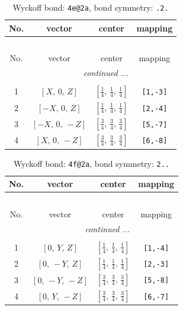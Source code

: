 \documentclass[fleqn,8pt]{jsarticle}
\begin{document}
\renewcommand{\arraystretch}{1.2}
\begin{longtable}{cccc}
\caption{Wyckoff bond: {\tt 4e@2a}, bond symmetry: {\tt .2.}}
 \\
 \hline \hline
No. & vector & center & mapping \\ \hline \endfirsthead

\multicolumn{3}{l}{\tablename\ \thetable{}} \\
 \hline \hline
No. & vector & center & mapping \\ \hline \endhead

 \hline \hline
\multicolumn{3}{r}{\footnotesize\it continued ...} \\ \endfoot

 \hline \hline
\multicolumn{3}{r}{} \\ \endlastfoot

1 & $\left[ X,\, 0,\, Z \right]$ & $\left[ \frac{1}{4},\, \frac{1}{4},\, \frac{1}{4} \right]$ & {\tt [1,-3]} \\ \hline
2 & $\left[ - X,\, 0,\, Z \right]$ & $\left[ \frac{1}{4},\, \frac{1}{4},\, \frac{1}{4} \right]$ & {\tt [2,-4]} \\ \hline
3 & $\left[ - X,\, 0,\, - Z \right]$ & $\left[ \frac{3}{4},\, \frac{3}{4},\, \frac{3}{4} \right]$ & {\tt [5,-7]} \\ \hline
4 & $\left[ X,\, 0,\, - Z \right]$ & $\left[ \frac{3}{4},\, \frac{3}{4},\, \frac{3}{4} \right]$ & {\tt [6,-8]} \\
\end{longtable}
\renewcommand{\arraystretch}{1.2}
\begin{longtable}{cccc}
\caption{Wyckoff bond: {\tt 4f@2a}, bond symmetry: {\tt 2..}}
 \\
 \hline \hline
No. & vector & center & mapping \\ \hline \endfirsthead

\multicolumn{3}{l}{\tablename\ \thetable{}} \\
 \hline \hline
No. & vector & center & mapping \\ \hline \endhead

 \hline \hline
\multicolumn{3}{r}{\footnotesize\it continued ...} \\ \endfoot

 \hline \hline
\multicolumn{3}{r}{} \\ \endlastfoot

1 & $\left[ 0,\, Y,\, Z \right]$ & $\left[ \frac{1}{4},\, \frac{1}{4},\, \frac{1}{4} \right]$ & {\tt [1,-4]} \\ \hline
2 & $\left[ 0,\, - Y,\, Z \right]$ & $\left[ \frac{1}{4},\, \frac{1}{4},\, \frac{1}{4} \right]$ & {\tt [2,-3]} \\ \hline
3 & $\left[ 0,\, - Y,\, - Z \right]$ & $\left[ \frac{3}{4},\, \frac{3}{4},\, \frac{3}{4} \right]$ & {\tt [5,-8]} \\ \hline
4 & $\left[ 0,\, Y,\, - Z \right]$ & $\left[ \frac{3}{4},\, \frac{3}{4},\, \frac{3}{4} \right]$ & {\tt [6,-7]} \\
\end{longtable}
\end{document}
